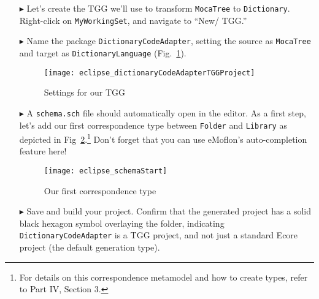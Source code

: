 \begin{enumerate}

\item[$\blacktriangleright$] Let's create the TGG we'll use to transform \texttt{MocaTree} to \texttt{Dictionary}. Right-click on \texttt{MyWorkingSet}, and
navigate to ``New/ TGG.''

\item[$\blacktriangleright$] Name the package \texttt{DictionaryCodeAdapter}, setting the source as \texttt{MocaTree} and target as \texttt{DictionaryLanguage}
(Fig.~\ref{eclipse:newTGGProject}).

\begin{figure}[htbp]
\begin{center}
  \texttt{[image: eclipse\_dictionaryCodeAdapterTGGProject]}
  \caption{Settings for our TGG}
  \label{eclipse:newTGGProject}
\end{center}
\end{figure}

\item[$\blacktriangleright$] A \texttt{schema.sch} file should automatically open in the editor. As a first step, let's add our first correspondence type
between \texttt{Folder} and \texttt{Library} as depicted in Fig~\ref{eclipse:firstSchema}.\footnote{For details on this correspondence metamodel and how to
create types, refer to Part IV, Section 3.} Don't forget that you can use eMoflon's auto-completion feature here!

\begin{figure}[htbp]
\begin{center}
  \texttt{[image: eclipse\_schemaStart]}
  \caption{Our first correspondence type}
  \label{eclipse:firstSchema}
\end{center}
\end{figure}

\item[$\blacktriangleright$] Save and build your project. Confirm that the generated project has a solid black hexagon symbol overlaying the folder, indicating
\texttt{DictionaryCodeAdapter} is a TGG project, and not just a standard Ecore project (the default generation type).

\end{enumerate}
